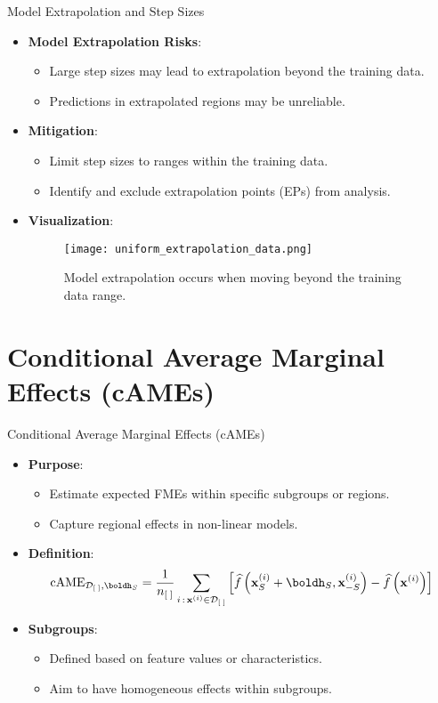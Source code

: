 \documentclass[11pt,compress,t,notes=noshow, aspectratio=169, xcolor=table]{beamer}
\begin{document}
\begin{frame}{Model Extrapolation and Step Sizes}
\begin{itemize}
\item \textbf{Model Extrapolation Risks}:
\begin{itemize}
\item Large step sizes may lead to extrapolation beyond the training data.
\item Predictions in extrapolated regions may be unreliable.
\end{itemize}
\item \textbf{Mitigation}:
\begin{itemize}
\item Limit step sizes to ranges within the training data.
\item Identify and exclude extrapolation points (EPs) from analysis.
\end{itemize}
\item \textbf{Visualization}:
\begin{figure}
  \centering
  \texttt{[image: uniform\_extrapolation\_data.png]}
  \caption{Model extrapolation occurs when moving beyond the training data range.}
\end{figure}
\end{itemize}
\end{frame}

\section{Conditional Average Marginal Effects (cAMEs)}

\begin{frame}{Conditional Average Marginal Effects (cAMEs)}
\begin{itemize}
\item \textbf{Purpose}:
\begin{itemize}
\item Estimate expected FMEs within specific subgroups or regions.
\item Capture regional effects in non-linear models.
\end{itemize}
\item \textbf{Definition}:
\[
\text{cAME}_{\mathcal{D}_{[\;]}, \boldh_S} = \frac{1}{n_{[\;]}} \sum_{i \,:\, \xv^{(i)} \in \mathcal{D}_{[\;]}} \left[ \widehat{f}\left(\xv_S^{(i)} + \boldh_S, \xv_{-S}^{(i)}\right) - \widehat{f}\left(\xv^{(i)}\right) \right]
\]
\item \textbf{Subgroups}:
\begin{itemize}
\item Defined based on feature values or characteristics.
\item Aim to have homogeneous effects within subgroups.
\end{itemize}
\end{itemize}
\end{frame}
\end{document}
